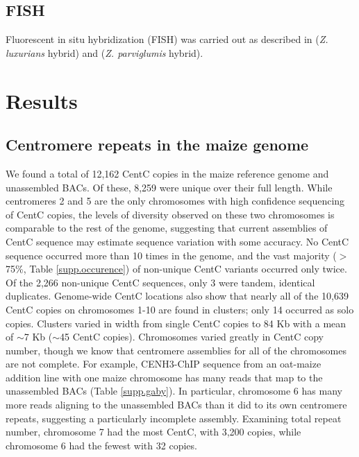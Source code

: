 \subsection*{FISH}

Fluorescent in situ hybridization (FISH) was carried out as described in \citet{kato2004paint} (\emph{Z. luxurians} hybrid) and \citet{Shi2010} (\emph{Z. parviglumis} hybrid). 

\section*{Results}
\label{results}

\subsection*{Centromere repeats in the maize genome}

We found a total of 12,162 CentC copies in the maize reference genome and unassembled BACs.  
Of these, 8,259 were unique over their full length.
While centromeres 2 and 5 are the only chromosomes with high confidence sequencing of CentC copies, the levels of diversity observed on these two chromosomes is comparable to the rest of the genome, suggesting that current assemblies of CentC sequence may estimate sequence variation with some accuracy.
No CentC sequence occurred more than 10 times in the genome, and the vast majority ($>$75\%, Table \ref{supp.occurence}) of non-unique CentC variants occurred only twice.  
Of the 2,266 non-unique CentC sequences, only 3 were tandem, identical duplicates.  
Genome-wide CentC locations also show that nearly all of the 10,639 CentC copies on chromosomes 1-10 are found in clusters; only 14 occurred as solo copies.  
Clusters varied in width from single CentC copies to 84 Kb with a mean of $\sim$7 Kb ($\sim$45 CentC copies). 
Chromosomes varied greatly in CentC copy number, though we know that centromere assemblies for all of the chromosomes are not complete.   
For example, CENH3-ChIP sequence from an oat-maize addition line with one maize chromosome \citep{kynast2001} has many reads that map to the unassembled BACs (Table \ref{supp.gaby}).  
In particular, chromosome 6 has many more reads aligning to the unassembled BACs than it did to its own centromere repeats, suggesting a particularly incomplete assembly.  
Examining total repeat number, chromosome 7 had the most CentC, with 3,200 copies, while chromosome 6 had the fewest with 32 copies.

